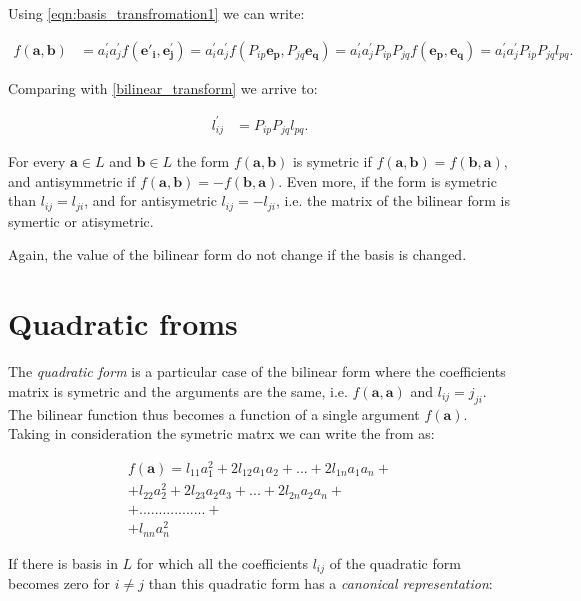 \documentclass{book}
\begin{document}
Using \eqref{eqn:basis_transfromation1} we can write:

\begin{align*}
f(\boldsymbol{a}, \boldsymbol{b}) &= a^{'}_i a^{'}_j f(\boldsymbol{e{'}_i}, \boldsymbol{e^{'}_j})
= a^{'}_i a^{'}_j f(P_{ip}\boldsymbol{e_p}, P_{jq}\boldsymbol{e_q})
= a^{'}_i a^{'}_j P_{ip}P_{jq} f(\boldsymbol{e_p}, \boldsymbol{e_q})
= a^{'}_i a^{'}_j P_{ip}P_{jq} l_{pq}.
\end{align*}

Comparing with \eqref{bilinear_transform} we arrive to:

\begin{align}
l^{'}_{ij} &= P_{ip}P_{jq} l_{pq} . \label{bilinear_transform1}
\end{align}

For every $\boldsymbol{a} \in L$ and $\boldsymbol{b} \in L$ the form $f(\boldsymbol{a}, \boldsymbol{b})$ is symetric if $f(\boldsymbol{a}, \boldsymbol{b}) = f(\boldsymbol{b}, \boldsymbol{a})$, and antisymmetric if $f(\boldsymbol{a}, \boldsymbol{b}) = -f(\boldsymbol{b}, \boldsymbol{a})$.
Even more, if the form is symetric than $l_{ij} = l_{ji}$, and for antisymetric  $l_{ij} = -l_{ji}$, i.e. the matrix of the bilinear form is symertic or atisymetric.

Again, the value of the bilinear form do not change if the basis is changed.

\section{Quadratic froms}

The \emph{quadratic form} is a particular case of the bilinear form where the coefficients matrix is symetric and the arguments are the same, i.e. $f(\boldsymbol{a}, \boldsymbol{a})$ and $l_{ij} = j_{ji}$. The bilinear function thus becomes a function of a single argument $f(\boldsymbol{a})$. Taking in consideration the symetric matrx we can write the from as:

\begin{align*}
f(\boldsymbol{a}) = l_{11}a_{1}^2 + 2l_{12}a_1a_2 + ... + 2l_{1n}a_1a_n + \\
+ l_{22}a_{2}^2 + 2l_{23}a_2a_3 + ... + 2l_{2n}a_2a_n + \\
+ ................. + \\
+ l_{nn}a_{n}^2
\end{align*}

If there is basis in $L$ for which all the coefficients $l_{ij}$ of the quadratic form becomes zero for $i \neq j$ than this quadratic form has a \emph{canonical representation}:
\end{document}
